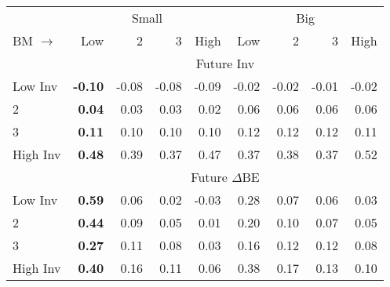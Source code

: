 
\begin{tabular}{lrrrrrrrr}
  \toprule
     & \multicolumn{4}{c}{Small} & \multicolumn{4}{c}{Big}  \\
     \cmidrule(r){2-5} \cmidrule(r){6-9}
    BM $\rightarrow$ & Low & 2 & 3 & High & Low & 2 & 3 & High  \\ 
  \midrule
  
  
    
  
    
  
    & \multicolumn{8}{c}{Future Inv}  \\
     \cmidrule(r){2-5} \cmidrule(r){6-9}
    Low Inv  & \textbf{-0.10}  & -0.08  & -0.08  & -0.09  & -0.02  & -0.02  & -0.01  & -0.02   \\
    2  & \textbf{0.04}  & 0.03  & 0.03  & 0.02  & 0.06  & 0.06  & 0.06  & 0.06   \\
    3  & \textbf{0.11}  & 0.10  & 0.10  & 0.10  & 0.12  & 0.12  & 0.12  & 0.11   \\
    High Inv  & \textbf{0.48}  & 0.39  & 0.37  & 0.47  & 0.37  & 0.38  & 0.37  & 0.52   \\
    
  
    & \multicolumn{8}{c}{Future $\Delta\text{BE}$}  \\
     \cmidrule(r){2-5} \cmidrule(r){6-9}
    Low Inv  & \textbf{0.59}  & 0.06  & 0.02  & -0.03  & 0.28  & 0.07  & 0.06  & 0.03   \\
    2  & \textbf{0.44}  & 0.09  & 0.05  & 0.01  & 0.20  & 0.10  & 0.07  & 0.05   \\
    3  & \textbf{0.27}  & 0.11  & 0.08  & 0.03  & 0.16  & 0.12  & 0.12  & 0.08   \\
    High Inv  & \textbf{0.40}  & 0.16  & 0.11  & 0.06  & 0.38  & 0.17  & 0.13  & 0.10   \\
    
  
  \bottomrule
\end{tabular}
